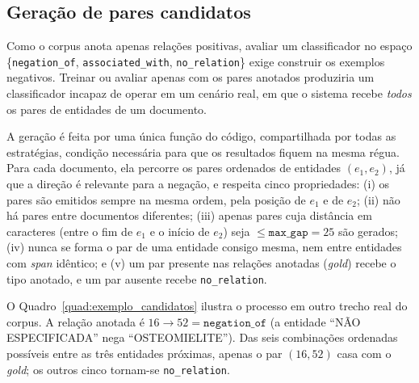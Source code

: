 

\subsection{Geração de pares candidatos}
\label{sec:candidatos}

Como o corpus anota apenas relações positivas, avaliar um classificador no espaço
\{\texttt{negation\_of}, \texttt{associated\_with}, \texttt{no\_relation}\} exige
construir os exemplos negativos. Treinar ou avaliar apenas com os pares
anotados produziria um classificador incapaz de operar em um cenário real, em que o
sistema recebe \emph{todos} os pares de entidades de um documento.

A geração é feita por uma única função do código, compartilhada por todas as
estratégias, condição necessária para que os resultados fiquem na mesma régua. Para
cada documento, ela percorre os pares ordenados de entidades $(e_1, e_2)$,
já que a direção é relevante para a negação, e respeita cinco propriedades:
(i) os pares são emitidos sempre na mesma ordem, pela posição de $e_1$ e de $e_2$;
(ii) não há pares entre documentos diferentes; (iii) apenas pares cuja distância em
caracteres (entre o fim de $e_1$ e o início de $e_2$) seja
$\leq \texttt{max\_gap}=25$ são gerados; (iv) nunca se forma o par de uma entidade
consigo mesma, nem entre entidades com \emph{span} idêntico; e (v) um par presente
nas relações anotadas (\emph{gold}) recebe o tipo anotado, e um par ausente recebe
\texttt{no\_relation}.

O Quadro~\ref{quad:exemplo_candidatos} ilustra o processo em outro trecho real do
corpus. A relação anotada é $16 \rightarrow 52 = \texttt{negation\_of}$ (a entidade
``NÃO ESPECIFICADA'' nega ``OSTEOMIELITE''). Das seis combinações ordenadas possíveis
entre as três entidades próximas, apenas o par $(16, 52)$ casa com o \emph{gold}; os
outros cinco tornam-se \texttt{no\_relation}.

